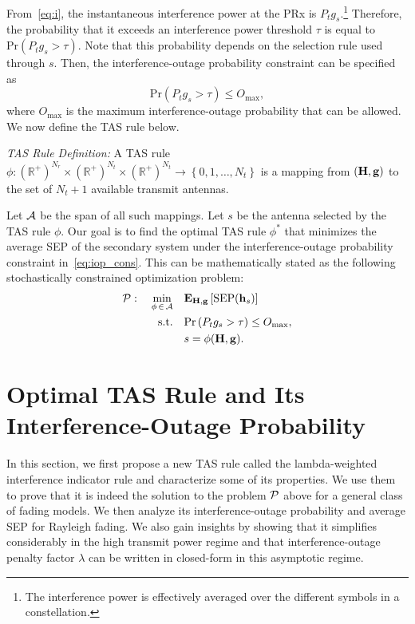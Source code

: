 \documentclass[12pt,draftcls,peerreview,onecolumn]{IEEEtran}
\newcommand{\brac}[1]{\left({#1}\right)}
\newcommand{\mtx}[1]{{\bf #1}} %
\newcommand{\explow}[2]{{\bf{E}}_{#1}\left[{#2}\right]}
\newcommand{\prob}[1]{\text{Pr}\brac{#1}}
\newcommand{\SEP}{\text{SEP}}
\newcommand{\nx}{{0}}
\newcommand{\lam}{\lambda}
\newcommand{\Nt}{{N_t}}
\newcommand{\Nr}{{N_r}}
\newcommand{\Pt}{{P_t}}
\newcommand{\puch}{g}
\newcommand{\gk}[1]{{\puch_{#1}}}
\newcommand{\g}{\mathbf{\puch}}
\newcommand{\outmax}{O_{\text{max}}}
\newcommand{\itau}{\tau}
\newcommand{\allopts}{\left\{\nx,1,\ldots,\Nt\right\}}
\newcommand{\asrule}{\phi}
\newcommand{\asspan}{{\cal A}}
\newcommand{\Hmx}{\mtx{H}}
\newcommand{\optproblem}{{\cal P}}
\begin{document}
From~\eqref{eq:i}, the instantaneous interference power at the PRx is $\Pt\gk{s}$.\footnote{The interference power is effectively averaged over the different symbols in a constellation.} Therefore, the probability that it exceeds an interference power threshold $\itau$ is equal to $\prob{\Pt\gk{s}>\itau}$. Note that this probability depends on the selection rule used through $s$. Then, the interference-outage probability constraint can be specified as 
\begin{equation}
\prob{\Pt\gk{s}>\itau} \leq \outmax,
\label{eq:iop_cons}
\end{equation}
where $\outmax$ is the maximum interference-outage probability that can be allowed. We now define the TAS rule below.

{\em TAS Rule Definition:} A TAS rule $\asrule:\brac{\mathbb{R}^{+}}^{\Nr}\times\brac{\mathbb{R}^{+}}^{\Nt} \times \brac{\mathbb{R}^{+}}^{\Nt} \rightarrow \allopts$ is a mapping from $\left(\Hmx,\g\right)$ to the set of $\Nt+1$ available transmit antennas. 

Let $\asspan$ be the span of all such mappings. Let $s$ be the antenna selected by the TAS rule $\asrule$. Our goal is to find the optimal TAS rule $\phi^{*}$ that minimizes the average SEP of the secondary system under the interference-outage probability constraint in~\eqref{eq:iop_cons}. This can be mathematically stated as the  following stochastically constrained optimization problem:
\begin{align}
\optproblem: \quad \min_{\asrule\,\in\,\asspan} \quad &\explow{\Hmx,\g}{\SEP(\hs)} \\
\label{eq:objective}
\text{s.t.} \quad &\prob{\Pt\gk{s}>\itau} \leq \outmax, \\
 &s = \phi(\Hmx,\g). 
\end{align}



\section{Optimal TAS Rule and Its Interference-Outage Probability}
\label{sec:analysis}

In this section, we first propose a new TAS rule called the lambda-weighted interference indicator rule and characterize some of its properties. We use them to prove that it is indeed the solution to the problem $\optproblem$ above for a general class of fading models. We then analyze its interference-outage probability and average SEP for Rayleigh fading. We also gain insights by showing that it simplifies considerably in the high transmit power regime and that interference-outage penalty factor $\lam$ can be written in closed-form in this asymptotic regime.
\end{document}
